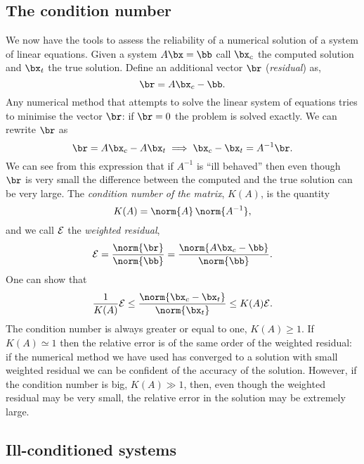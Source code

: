 \subsection{The condition number}

We  now  have the   tools  to assess  the reliability  of  a numerical
solution of  a system of linear equations.    Given a system  $A \bx =
\bb$ call $\bx_c$ the computed solution and $\bx_t$ the true solution.
Define an additional vector $\br$ (\textit{residual}) as,
%
\begin{equation*}
 \br = A \bx_c - \bb .
\end{equation*}
%
Any numerical    method that attempts  to solve   the linear system of
equations tries to  minimise the  vector $\br$: if  $\br =  0$ the
problem is solved exactly.  We can rewrite $\br$ as
%
\begin{equation*}
  \br = A \bx_c - A \bx_t \implies \bx_c - \bx_t = A^{-1} \br .
\end{equation*}
%
We can  see from this expression  that if $A^{-1}$  is ``ill behaved''
then  even   though $\br$  is very  small   the difference between the
computed and the true solution  can be very  large.  The
\textit{condition number of the matrix}, $K(A)$, is the
quantity
%
\begin{equation*}
  K(A) = \norm{ A } \, \norm{ A^{-1} },
\end{equation*}
%
and we call ${\cal E}$ the \textit{weighted residual},
%
\begin{equation*}
  {\cal E} = \frac{\norm{ \br }}{\norm{ \bb }} = 
  \frac{\norm{ A \bx_c - \bb }}{\norm{ \bb }} .
\end{equation*}
%
One can show that 
%
\begin{equation}
 \frac{1}{K(A)} {\cal E} \le 
      \frac{ \norm{ \bx_c - \bx_t }}{\norm{ \bx_t }} \le
      K(A) {\cal E} .
 \label{cond_and_res}
\end{equation}
%
The condition number is always greater or equal to one, $K(A) \ge 1$.
If $K(A) \simeq 1$ then the relative error is of the same order of the
weighted residual: if the numerical method we have used has converged
to a solution with small weighted residual we can be confident of the
accuracy of the solution.  However, if the condition number is big,
$K(A) \gg 1$, then, even though the weighted residual may be very
small, the relative error in the solution may be extremely large.
 
\subsection{Ill-conditioned systems}

